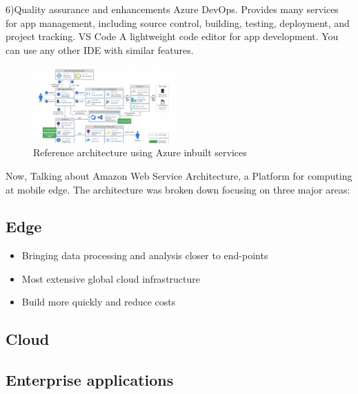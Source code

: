 \documentclass[9pt,software]{livecoms}
\begin{document}
6)Quality assurance and enhancements
Azure DevOps. Provides many services for app management, including source control, building, testing, deployment, and project tracking.
VS Code A lightweight code editor for app development. You can use any other IDE with similar features.


\begin{figure}
  \caption{Reference architecture using Azure inbuilt services}
  \centering
  \includegraphics[width=0.5\textwidth]{azure.png}
\end{figure}

Now, Talking about Amazon Web Service Architecture, a Platform for computing at mobile edge. 
The architecture was broken down focusing on three major areas:
\subsection{Edge}
\begin{itemize}
\item Bringing data processing and analysis closer to end-points
\item Most extensive global cloud infrastructure
\item Build more quickly and reduce costs
\end{itemize}

\subsection{Cloud}
\subsection{Enterprise applications}
\end{document}
